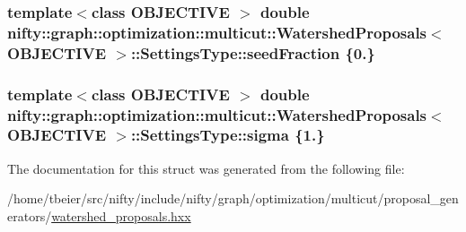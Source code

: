 \subsubsection[{seed\+Fraction}]{\setlength{\rightskip}{0pt plus 5cm}template$<$class O\+B\+J\+E\+C\+T\+I\+V\+E $>$ double {\bf nifty\+::graph\+::optimization\+::multicut\+::\+Watershed\+Proposals}$<$ O\+B\+J\+E\+C\+T\+I\+V\+E $>$\+::Settings\+Type\+::seed\+Fraction \{0.\}}\label{structnifty_1_1graph_1_1optimization_1_1multicut_1_1WatershedProposals_1_1SettingsType_a9632f51291234a1a5ae90e01ade142a4}
\hypertarget{structnifty_1_1graph_1_1optimization_1_1multicut_1_1WatershedProposals_1_1SettingsType_a015986f91cf741f2992ca66219d1d0d8}{}
\subsubsection[{sigma}]{\setlength{\rightskip}{0pt plus 5cm}template$<$class O\+B\+J\+E\+C\+T\+I\+V\+E $>$ double {\bf nifty\+::graph\+::optimization\+::multicut\+::\+Watershed\+Proposals}$<$ O\+B\+J\+E\+C\+T\+I\+V\+E $>$\+::Settings\+Type\+::sigma \{1.\}}\label{structnifty_1_1graph_1_1optimization_1_1multicut_1_1WatershedProposals_1_1SettingsType_a015986f91cf741f2992ca66219d1d0d8}


The documentation for this struct was generated from the following file\+:\begin{DoxyCompactItemize}
\item 
/home/tbeier/src/nifty/include/nifty/graph/optimization/multicut/proposal\+\_\+generators/\hyperlink{watershed__proposals_8hxx}{watershed\+\_\+proposals.\+hxx}\end{DoxyCompactItemize}
